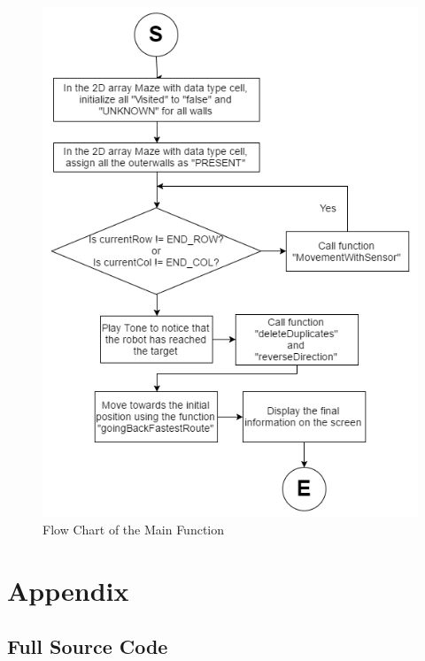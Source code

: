 \documentclass[11pt]{article}
\begin{document}
\begin{figure}[htp]
\centering
\includegraphics[scale=0.7]{images/Software_Flowchart/task_main.png}
\caption{Flow Chart of the Main Function}
\label{}
\end{figure}
\newpage




\section{Appendix}
\subsection{Full Source Code}
\end{document}
